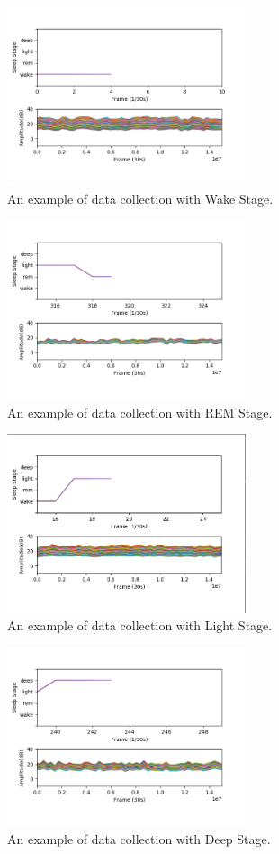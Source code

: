 \documentclass[10pt,letterpaper]{article}
\begin{document}
	
\begin{figure}[htbp]
	\centerline{\includegraphics[width=70mm,scale=0.2]{VIS05.png}}
	\caption{An example of data collection with Wake Stage.}
	\label{fig:dataCollect01}
\end{figure}
\begin{figure}[htbp]
	\centerline{\includegraphics[width=70mm,scale=0.2]{VIS06.png}}
	\caption{An example of data collection with REM Stage.}
	\label{fig:dataCollect02}
\end{figure}
\begin{figure}[htbp]
	\centerline{\includegraphics[width=70mm,scale=0.2]{VIS07.png}}
	\caption{An example of data collection with Light Stage.}
	\label{fig:dataCollect03}
\end{figure}
\begin{figure}[htbp]
	\centerline{\includegraphics[width=70mm,scale=0.2]{VIS08.png}}
	\caption{An example of data collection with Deep Stage.}
	\label{fig:dataCollect04}
\end{figure}
\end{document}
